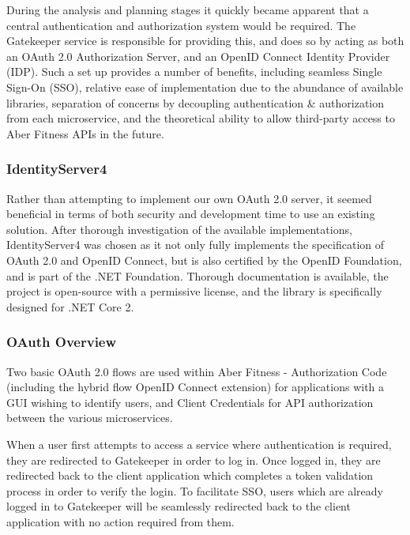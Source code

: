 During the analysis and planning stages it quickly became apparent that a central authentication and authorization system would be required. The Gatekeeper service is responsible for providing this, and does so by acting as both an OAuth 2.0 Authorization Server, and an OpenID Connect Identity Provider (IDP). Such a set up provides a number of benefits, including seamless Single Sign-On (SSO), relative ease of implementation due to the abundance of available libraries, separation of concerns by decoupling authentication \& authorization from each microservice, and the theoretical ability to allow third-party access to Aber Fitness APIs in the future.

\subsubsection{IdentityServer4}

Rather than attempting to implement our own OAuth 2.0 server, it seemed beneficial in terms of both security and development time to use an existing solution. After thorough investigation of the available implementations, IdentityServer4\cite{identityserver4} was chosen as it not only fully implements the specification of OAuth 2.0 and OpenID Connect, but is also certified by the OpenID Foundation, and is part of the .NET Foundation\cite{identityserver4docs}. Thorough documentation is available, the project is open-source with a permissive license, and the library is specifically designed for .NET Core 2.

\subsubsection{OAuth Overview}

Two basic OAuth 2.0 flows are used within Aber Fitness - Authorization Code (including the hybrid flow OpenID Connect extension) for applications with a GUI wishing to identify users, and Client Credentials for API authorization between the various microservices.

When a user first attempts to access a service where authentication is required, they are redirected to Gatekeeper in order to log in. Once logged in, they are redirected back to the client application which completes a token validation process in order to verify the login. To facilitate SSO, users which are already logged in to Gatekeeper will be seamlessly redirected back to the client application with no action required from them.


